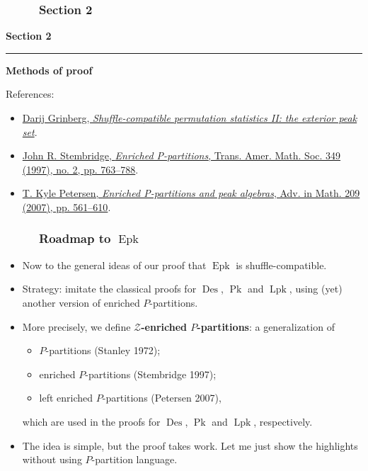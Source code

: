 \documentclass{beamer}
\newcommand{\red}{\color{red}}
\newcommand{\Lpk}{\operatorname{Lpk}}
\newcommand{\Pk}{\operatorname{Pk}}
\newcommand{\Epk}{\operatorname{Epk}}
\newcommand{\Des}{\operatorname{Des}}
\newcommand{\fti}[1]{\frametitle{\ \ \ \ \ #1}}
\theoremstyle{plain}
\begin{document}
\begin{frame}
\fti{Section 2}
\begin{center}
{\LARGE \bf Section 2} \\
\noindent\rule[0.5ex]{\linewidth}{1pt}
{\Large \bf Methods of proof}
\end{center}
\vspace{1cm}
References:
\begin{itemize}
\item \href{https://github.com/darijgr/gzshuf}{\red Darij Grinberg, \textit{Shuffle-compatible permutation statistics II: the exterior peak set}}.
\item \href{http://www.ams.org/journals/tran/1997-349-02/S0002-9947-97-01804-7/}{\red John R. Stembridge, \textit{Enriched P-partitions}, Trans. Amer. Math. Soc. 349 (1997), no. 2, pp. 763--788}.
\item \href{https://doi.org/10.1016/j.aim.2006.05.0160}{\red T. Kyle Petersen, \textit{Enriched P-partitions and peak algebras}, Adv. in Math. 209 (2007), pp. 561--610}.
\end{itemize}
\end{frame}

\begin{frame}
\fti{Roadmap to $\Epk$}

\begin{itemize}

\item Now to the general ideas of our proof that $\Epk$ is shuffle-compatible.

\item Strategy: imitate the classical proofs for $\Des$, $\Pk$ and $\Lpk$,
      using (yet) another version of enriched $P$-partitions.

\pause

\item More precisely, we define
      \textbf{$\mathcal{Z}$-enriched $P$-partitions}:
      a generalization of
      \begin{itemize}
      \item $P$-partitions (Stanley 1972);
      \item enriched $P$-partitions (Stembridge 1997);
      \item left enriched $P$-partitions (Petersen 2007),
      \end{itemize}
      which are used in the proofs for $\Des$, $\Pk$
      and $\Lpk$, respectively.

\pause

\item The idea is simple, but the proof takes work.
      Let me just show the highlights without using
      $P$-partition language.

\end{itemize}

\end{frame}
\end{document}
